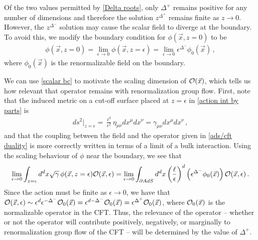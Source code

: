 \documentclass[../PhD.tex]{subfiles}
\begin{document}
Of the two values permitted by \eqref{Delta roots}, only $\Delta^+$ remains positive for any number of dimensions and therefore the solution $z^{\Delta^+}$ remains finite as $z \to 0$. However, the $z^{\Delta^-}$ solution may cause the scalar field to diverge at the boundary. To avoid this, we modify the boundary condition for $\phi(\vec x, z=0)$ to be
\begin{align}
\label{scalar bc}
\phi(\vec x, z=0) = \lim_{\epsilon \to 0} \phi(\vec x, z=\epsilon) = \lim_{\epsilon \to 0} \epsilon^{\Delta^-} \phi_0 (\vec x) \, ,
\end{align}
where $\phi_0 (\vec x)$ is the renormalizable field on the boundary. 

We can use \eqref{scalar bc} to motivate the scaling dimension of $\mathcal O (\vec x)$, which tells us how relevant that operator remains with renormalization group flow. First, note that the induced metric on a cut-off surface placed at $z=\epsilon$ in \eqref{action int by parts} is
\begin{align}
ds^2 \Big|_{z=\epsilon} = \frac{\ell^2}{\epsilon^2} \eta_{\mu \nu} dx^\mu dx^\nu = \gamma_{\mu \nu} dx^\mu dx^\nu \, ,
\end{align}
and that the coupling between the field and the operator given in \eqref{ads/cft duality} is more correctly written in terms of a limit of a bulk interaction. Using the scaling behaviour of $\phi$ near the boundary, we see that
\begin{align}
\lim_{\epsilon \to 0} \int_{z=\epsilon} d^{d}x \sqrt{\gamma} \, \phi(\vec x, z = \epsilon) \mathcal O(\vec x, \epsilon) = \lim_{\epsilon \to 0} \int_{\partial AdS} d^d x \left(\frac{\ell}{\epsilon}\right)^d \left( \epsilon^{\Delta^-} \phi_0 (\vec x) \right) \mathcal O (\vec x, \epsilon) \, .
\end{align}
Since the action must be finite as $\epsilon \to 0$, we have that $ \mathcal O(\vec x, \epsilon) \sim \epsilon^{d} \epsilon^{-\Delta^-} \mathcal O_0 (\vec x) = \epsilon^{d - \Delta^-} \mathcal O_0 (\vec x) = \epsilon^{\Delta^+} \mathcal O_0 (\vec x)$, where $\mathcal O_0(\vec x)$ is the normalizable operator in the CFT. Thus, the relevance of the operator -- whether or not the operator will contribute positively, negatively, or marginally to renormalization group flow of the CFT \cite{0908.0333} -- will be determined by the value of $\Delta^+$.
\end{document}
